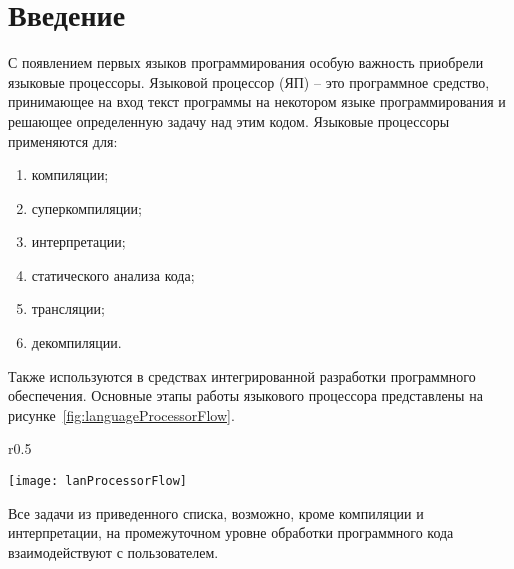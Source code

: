 \section*{Введение}


С появлением первых языков программирования особую важность приобрели языковые процессоры. Языковой процессор (ЯП) -- это программное средство, принимающее на вход текст программы на некотором языке программирования и решающее определенную задачу над этим кодом. Языковые процессоры применяются для:
\begin{enumerate}
\item компиляции;
\item суперкомпиляции;
\item интерпретации;
\item статического анализа кода;
\item трансляции;
\item декомпиляции.
\end{enumerate}
Также используются в средствах интегрированной разработки программного обеспечения. Основные этапы работы языкового процессора представлены на рисунке~\ref{fig:languageProcessorFlow}.

\begin{wrapfigure}{r}{0.5\textwidth}
	\begin{center}
		\texttt{[image: lanProcessorFlow]}
	\end{center}
	\caption{Этапы работы ЯП}
	\label{fig:languageProcessorFlow}	
\end{wrapfigure}

Все задачи из приведенного списка, возможно, кроме компиляции и интерпретации, на промежуточном уровне обработки программного кода взаимодействуют с пользователем.

